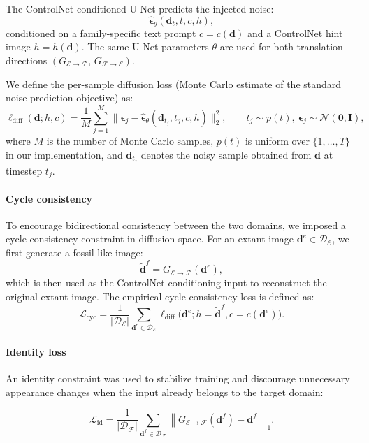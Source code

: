 \documentclass[pdflatex,lineno,sn-nature]{sn-jnl}%
\theoremstyle{plain}%
\theoremstyle{definition}%
\theoremstyle{remark}%
\begin{document}
The ControlNet-conditioned U-Net predicts the injected noise:
\[
\hat{\boldsymbol{\epsilon}}_\theta(\mathbf{d}_t, t, c, h),
\]
conditioned on a family-specific text prompt $c=c(\mathbf{d})$ and a ControlNet hint image $h=h(\mathbf{d})$. The same U-Net parameters $\theta$ are used for both translation directions $(G_{\mathcal{E}\rightarrow\mathcal{F}},\,G_{\mathcal{F}\rightarrow\mathcal{E}})$.

We define the per-sample diffusion loss (Monte Carlo estimate of the standard noise-prediction objective) as:
\[
\ell_{\text{diff}}(\mathbf{d}; h, c)
=
\frac{1}{M}
\sum_{j=1}^{M}
\big\|
\boldsymbol{\epsilon}_j
-
\hat{\boldsymbol{\epsilon}}_\theta(\mathbf{d}_{t_j}, t_j, c, h)
\big\|_2^2,
\qquad
t_j \sim p(t),\ \boldsymbol{\epsilon}_j \sim \mathcal{N}(\mathbf{0},\mathbf{I}),
\]
where $M$ is the number of Monte Carlo samples, $p(t)$ is uniform over $\{1,\dots,T\}$ in our implementation, and $\mathbf{d}_{t_j}$ denotes the noisy sample obtained from $\mathbf{d}$ at timestep $t_j$.

\paragraph{Cycle consistency}
To encourage bidirectional consistency between the two domains, we imposed a cycle-consistency constraint in diffusion space.
For an extant image $\mathbf{d}^e \in \mathcal{D}_{\mathcal{E}}$, we first generate a fossil-like image:
\[
\tilde{\mathbf{d}}^f
=
G_{\mathcal{E}\rightarrow\mathcal{F}}(\mathbf{d}^e),
\]
which is then used as the ControlNet conditioning input to reconstruct the original extant image.
The empirical cycle-consistency loss is defined as:
\[
\mathcal{L}_{\text{cyc}}
=
\frac{1}{|\mathcal{D}_{\mathcal{E}}|}
\sum_{\mathbf{d}^e \in \mathcal{D}_{\mathcal{E}}}
\ell_{\text{diff}}
\big(
\mathbf{d}^e;
h = \tilde{\mathbf{d}}^f,
c = c(\mathbf{d}^e)
\big).
\]

\paragraph{Identity loss}
An identity constraint was used to stabilize training and discourage unnecessary appearance changes when the input already belongs to the target domain:

\[
\mathcal{L}_{\mathrm{id}}
=
\frac{1}{\lvert \mathcal{D}_{\mathcal{F}} \rvert}
\sum_{\mathbf{d}^f \in \mathcal{D}_{\mathcal{F}}}
\left\|
G_{\mathcal{E}\rightarrow\mathcal{F}}(\mathbf{d}^f)
-
\mathbf{d}^f
\right\|_1 .
\]
\end{document}
